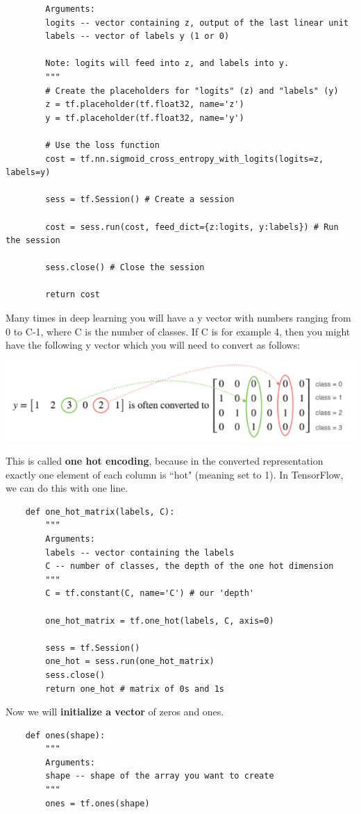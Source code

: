 \documentclass[11pt, a4paper]{article}
\begin{document}
\begin{spacing}{1.1}
\begin{lstlisting}
		Arguments:
		logits -- vector containing z, output of the last linear unit 
		labels -- vector of labels y (1 or 0) 
		
		Note: logits will feed into z, and labels into y. 
		"""
		# Create the placeholders for "logits" (z) and "labels" (y)
		z = tf.placeholder(tf.float32, name='z')
		y = tf.placeholder(tf.float32, name='y')
		
		# Use the loss function
		cost = tf.nn.sigmoid_cross_entropy_with_logits(logits=z, labels=y)
		
		sess = tf.Session() # Create a session
		
		cost = sess.run(cost, feed_dict={z:logits, y:labels}) # Run the session
		
		sess.close() # Close the session
		
		return cost	\end{lstlisting} \vspace*{1mm}
	Many times in deep learning you will have a y vector with numbers ranging from 0 to C-1, where C is the number of classes. If C is for example 4, then you might have the following y vector which you will need to convert as follows:
	\begin{center} \includegraphics[scale=.6]{one_hot} \\	\end{center}
	This is called \textbf{one hot encoding}, because in the converted representation exactly one element of each column is ``hot" (meaning set to 1). In TensorFlow, we can do this with one line.
	\begin{lstlisting}
	def one_hot_matrix(labels, C):
		"""		
		Arguments:
		labels -- vector containing the labels 
		C -- number of classes, the depth of the one hot dimension
		"""
		C = tf.constant(C, name='C') # our 'depth'
		
		one_hot_matrix = tf.one_hot(labels, C, axis=0)

		sess = tf.Session()
		one_hot = sess.run(one_hot_matrix)
		sess.close()
		return one_hot # matrix of 0s and 1s	\end{lstlisting} \newpage

	\noindent Now we will \textbf{initialize a vector} of zeros and ones.
	\begin{lstlisting}
	def ones(shape):
		"""
		Arguments:
		shape -- shape of the array you want to create
		"""
		ones = tf.ones(shape)
		

\end{lstlisting}
\end{spacing}
\end{document}
